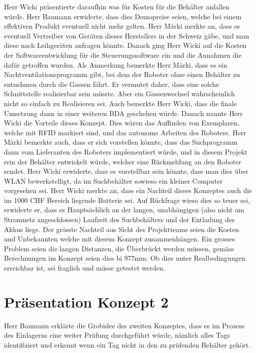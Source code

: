 \documentclass[parskip=full, a4paper]{scrreprt}
\begin{document}
Herr Wicki präsentierte daraufhin was für Kosten für die Behälter anfallen würde. Herr Baumann erwiderte, dass dies Demopreise seien, welche bei einem effektiven Produkt eventuell nicht mehr gelten.
Herr Märki merkte an, dass es eventuell Vertreiber von Geräten dieses Herstellers in der Schweiz gäbe, und man diese nach Leihgeräten anfragen könnte.
Danach ging Herr Wicki auf die Kosten der Softwareentwicklung für die Steuerungssoftware ein und die Annahmen die dafür getroffen wurden. Als Anmerkung bemerkte Herr Märki, dass es ein Nachtventilationsprogramm gibt, bei dem der Roboter ohne einen Behälter zu entnehmen durch die Gassen fährt. Er vermutet daher, dass eine solche Schnittstelle realisierbar sein müsste. Aber ein Gassenwechsel wahrscheinlich nicht so einfach zu Realisieren sei.
Auch bemerkte Herr Wicki, dass die finale Umsetzung dann in einer weiteren BDA geschehen würde.
Danach nannte Herr Wicki die Vorteile dieses Konzept. Dies wären das Auffinden von Exemplaren, welche mit RFID markiert sind, und das autonome Arbeiten des Roboters.
Herr Märki bemerkte auch, dass er sich vorstellen könnte, dass das Suchprogramm dann vom Lieferanten des Roboters implementiert würde, und in diesem Projekt rein der Behälter entwickelt würde, welcher eine Rückmeldung an den Roboter sendet. Herr Wicki erwiderte, dass es vorstellbar sein könnte, dass man dies über WLAN bewerkstelligt, da im Suchbehälter sowieso ein kleiner Computer vorgesehen sei.
Herr Wicki merkte an, dass ein Nachteil dieses Konzeptes auch die im 1000 CHF Bereich liegende Batterie sei. Auf Rückfrage wieso dies so teuer sei, erwiderte er, dass es Hauptsächlich an der langen, unabhängigen (also nicht am Stromnetz angeschlossen) Laufzeit des Suchbehälters und der Entladung des Akkus liege. Der grösste Nachteil aus Sicht des Projektteams seien die Kosten und Unbekannten welche mit diesem Konzept zusammenhängen.
Ein grosses Problem seien die langen Distanzen, die Überbrückt werden müssen, gemäss Berechnungen im Konzept seien dies bi 977mm. Ob dies unter Realbedingungen erreichbar ist, sei fraglich und müsse getestet werden.

\chapter{Präsentation Konzept 2}
Herr Baumann erklärte die Grobidee des zweiten Konzeptes, dass es im Prozess des Einlagerns eine weiter Prüfung durchgeführt würde, nämlich alles Tags identifiziert und erkennt wenn ein Tag nicht in den zu prüfenden Behälter gehört.
\end{document}
